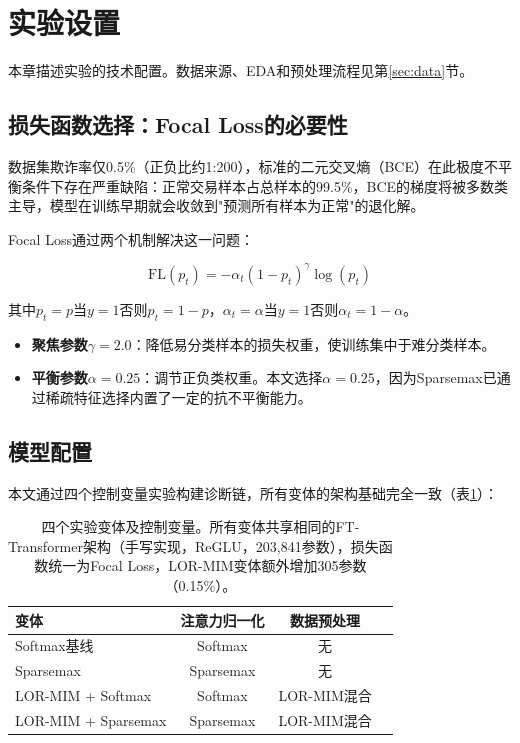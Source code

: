 
\section{实验设置}
\label{sec:setup}

本章描述实验的技术配置。数据来源、EDA和预处理流程见第\ref{sec:data}节。

\subsection{损失函数选择：Focal Loss的必要性}

数据集欺诈率仅0.5\%（正负比约1:200），标准的二元交叉熵（BCE）在此极度不平衡条件下存在严重缺陷：正常交易样本占总样本的99.5\%，BCE的梯度将被多数类主导，模型在训练早期就会收敛到"预测所有样本为正常"的退化解。

Focal Loss\cite{lin2017focal}通过两个机制解决这一问题：

\begin{equation}
\text{FL}(p_t) = -\alpha_t (1 - p_t)^{\gamma} \log(p_t)
\label{eq:focal}
\end{equation}

其中$p_t = p$当$y=1$否则$p_t = 1-p$，$\alpha_t = \alpha$当$y=1$否则$\alpha_t = 1-\alpha$。

\begin{itemize}
    \item \textbf{聚焦参数$\gamma=2.0$}：降低易分类样本的损失权重，使训练集中于难分类样本。
    \item \textbf{平衡参数$\alpha=0.25$}：调节正负类权重。本文选择$\alpha=0.25$，因为Sparsemax已通过稀疏特征选择内置了一定的抗不平衡能力。
\end{itemize}


\subsection{模型配置}

本文通过四个控制变量实验构建诊断链，所有变体的架构基础完全一致（表\ref{tab:variant_config}）：

\begin{table}[H]
\centering
\caption{四个实验变体及控制变量。所有变体共享相同的FT-Transformer架构（手写实现，ReGLU，203,841参数），损失函数统一为Focal Loss，LOR-MIM变体额外增加305参数（0.15\%）。}
\label{tab:variant_config}
\begin{tabular}{lccc}
\toprule
\textbf{变体} & \textbf{注意力归一化} & \textbf{数据预处理} \\
\midrule
Softmax基线         & Softmax   & 无 \\
Sparsemax           & Sparsemax & 无 \\
LOR-MIM + Softmax   & Softmax   & LOR-MIM混合 \\
LOR-MIM + Sparsemax & Sparsemax & LOR-MIM混合 \\
\bottomrule
\end{tabular}
\end{table}

